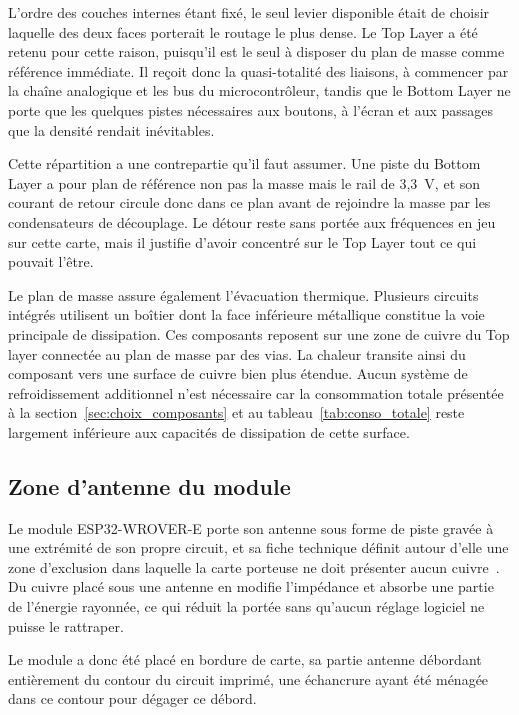 L'ordre des couches internes étant fixé, le seul levier disponible était de choisir laquelle des deux faces porterait le routage le plus dense. Le Top Layer a été retenu pour cette raison, puisqu'il est le seul à disposer du plan de masse comme référence immédiate. Il reçoit donc la quasi-totalité des liaisons, à commencer par la chaîne analogique et les bus du microcontrôleur, tandis que le Bottom Layer ne porte que les quelques pistes nécessaires aux boutons, à l'écran et aux passages que la densité rendait inévitables.

Cette répartition a une contrepartie qu'il faut assumer. Une piste du Bottom Layer a pour plan de référence non pas la masse mais le rail de 3,3~V, et son courant de retour circule donc dans ce plan avant de rejoindre la masse par les condensateurs de découplage. Le détour reste sans portée aux fréquences en jeu sur cette carte, mais il justifie d'avoir concentré sur le Top Layer tout ce qui pouvait l'être.

Le plan de masse assure également l'évacuation thermique. Plusieurs circuits intégrés utilisent un boîtier dont la face inférieure métallique constitue la voie principale de dissipation. Ces composants reposent sur une zone de cuivre du Top layer connectée au plan de masse par des vias. La chaleur transite ainsi du composant vers une surface de cuivre bien plus étendue. Aucun système de refroidissement additionnel n'est nécessaire car la consommation totale présentée à la section~\ref{sec:choix_composants} et au tableau~\ref{tab:conso_totale} reste largement inférieure aux capacités de dissipation de cette surface.

\subsection{Zone d'antenne du module}

Le module ESP32-WROVER-E porte son antenne sous forme de piste gravée à une extrémité de son propre circuit, et sa fiche technique définit autour d'elle une zone d'exclusion dans laquelle la carte porteuse ne doit présenter aucun cuivre~\cite{ESP32_WROVER-E_Datasheet, ESP32_hardware_design}. Du cuivre placé sous une antenne en modifie l'impédance et absorbe une partie de l'énergie rayonnée, ce qui réduit la portée sans qu'aucun réglage logiciel ne puisse le rattraper.

Le module a donc été placé en bordure de carte, sa partie antenne débordant entièrement du contour du circuit imprimé, une échancrure ayant été ménagée dans ce contour pour dégager ce débord.

